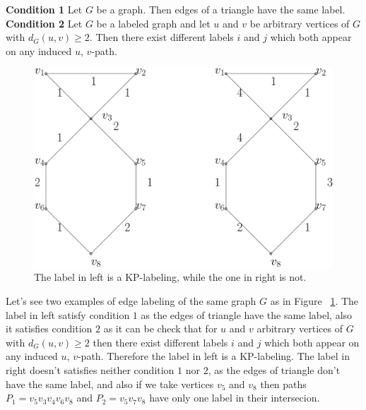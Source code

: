 \documentclass[12pt,a4paper,titlepage,openany]{report}
\begin{document}
\textbf{Condition 1} Let $G$ be a graph. Then edges of a triangle have the same label.\newline
\textbf{Condition 2} Let $G$ be a labeled graph and let $u$ and $v$ be arbitrary vertices of $G$ with $d_G(u,v) \geq 2$. Then there exist different labels $i$ and $j$ which both appear on any induced $u$, $v$-path.\newline
\begin{figure}[h!]\label{kpexample}
\begin{center}
\includegraphics[width=0.75\linewidth]{figures/kpexample.png}
\end{center}
\caption{The label in left is a KP-labeling, while the one in right is not.}
\end{figure}
\begin{example}
Let's see two examples of edge labeling of the same graph $G$ as in Figure ~\ref{kpexample}.\newline
The label in left satisfy condition $1$ as the edges of triangle have the same label, also it satisfies condition $2$ as it can be check that for $u$ and $v$ arbitrary vertices of $G$ with $d_G(u,v) \geq 2$ then there exist different labels $i$ and $j$ which both appear on any induced $u$, $v$-path. Therefore the label in left is a KP-labeling.\newline
The label in right doesn't satisfies neither condition $1$ nor $2$, as the edges of triangle don't have the same label, and also if we take vertices $v_5$ and $v_8$ then paths $P_1=v_5v_3v_4v_6v_8$ and $P_2=v_5v_7v_8$ have only one label in their intersecion.
\end{example}
\end{document}
